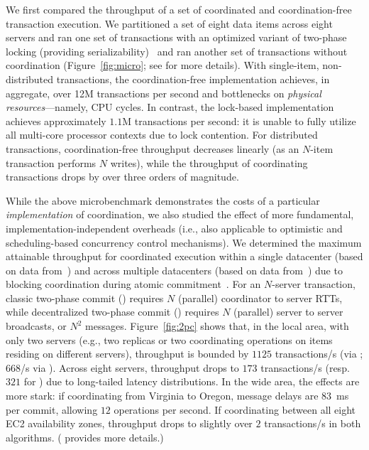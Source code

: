 We first compared the throughput of a set of coordinated and
coordination-free transaction execution. We partitioned a set
of eight data items across eight servers and ran one set of
transactions with an optimized variant of two-phase locking (providing
serializability)~\cite{bernstein-book} and ran another set of transactions
without coordination (Figure~\ref{fig:micro}; see
\rappendix{\appexperiment} for more details). With
single-item, non-distributed transactions, the coordination-free
implementation achieves, in aggregate, over 12M transactions per
second and bottlenecks on \textit{physical resources}---namely, CPU
cycles. In contrast, the lock-based implementation achieves
approximately $1.1$M transactions per second: it is unable to fully
utilize all multi-core processor contexts due to lock contention. For
distributed transactions, coordination-free throughput decreases linearly
(as an $N$-item transaction performs $N$ writes), while the throughput
of coordinating transactions drops by over three orders of
magnitude.



While the above microbenchmark demonstrates the costs of a particular
\textit{implementation} of coordination, we also studied the
effect of more fundamental, implementation-independent overheads
(i.e., also applicable to optimistic and scheduling-based concurrency
control mechanisms). We determined the maximum attainable throughput
for coordinated execution within a single datacenter (based on data
from~\cite{bobtail}) and across multiple datacenters (based on data
from~\cite{hat-vldb}) due to blocking coordination during atomic
commitment~\cite{bernstein-book}. For an $N$-server transaction,
classic two-phase commit (\cpc) requires $N$ (parallel) coordinator to
server RTTs, while decentralized two-phase commit (\dpc) requires $N$
(parallel) server to server broadcasts, or $N^2$
messages. Figure~\ref{fig:2pc} shows that, in the local area, with
only two servers (e.g., two replicas or two coordinating operations on
items residing on different servers), throughput is bounded by $1125$
transactions/s (via \dpc; $668$/s via \cpc). Across eight servers,
\dpc throughput drops to $173$ transactions/s (resp. $321$ for \cpc)
due to long-tailed latency distributions. In the wide area, the
effects are more stark: if coordinating from Virginia to Oregon, \dpc
message delays are $83$~ms per commit, allowing $12$ operations per
second. If coordinating between all eight EC2 availability zones,
throughput drops to slightly over $2$ transactions/s in both
algorithms. (\rappendix{\appexperiment} provides more details.)

